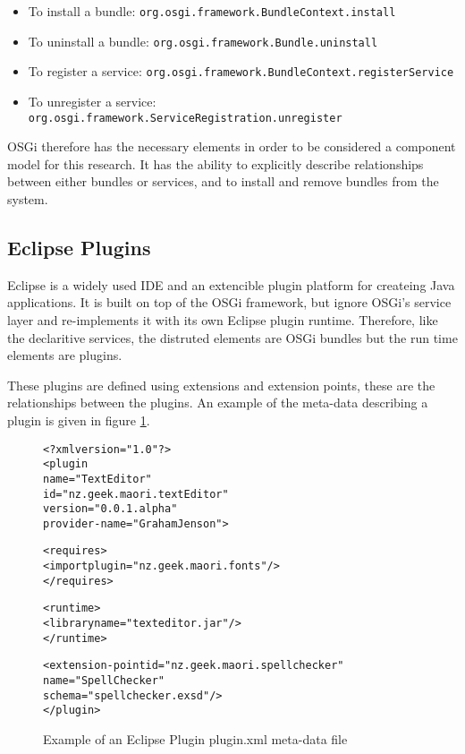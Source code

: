 \begin{itemize}
  \item To install a bundle: \verb+org.osgi.framework.BundleContext.install+
  \item To uninstall a bundle: \verb+org.osgi.framework.Bundle.uninstall+
  \item To register a service: \verb+org.osgi.framework.BundleContext.registerService+
  \item To unregister a service: \verb+org.osgi.framework.ServiceRegistration.unregister+
\end{itemize}

OSGi therefore has the necessary elements in order to be considered a component model for this research. 
It has the ability to explicitly describe relationships between either bundles or services, and to install and remove bundles from the system.

\subsection{Eclipse Plugins}
Eclipse is a widely used IDE and an extencible plugin platform for createing Java applications.
It is built on top of the OSGi framework, but ignore OSGi's service layer and re-implements it with its own Eclipse plugin runtime.
Therefore, like the declaritive services, the distruted elements are OSGi bundles but the run time elements are plugins.

These plugins are defined using extensions and extension points, these are the relationships between the plugins.
An example of the meta-data describing a plugin is given in figure \ref{eclipseplugin}. 

\begin{figure}[htp]
\begin{center}
\begin{alltt}
<?xml version="1.0"?>
<plugin
    name="Text Editor"
    id="nz.geek.maori.textEditor"
    version="0.0.1.alpha"
    provider-name="Graham Jenson">
    
    <requires>
        <import plugin="nz.geek.maori.fonts"/>
    </requires>

    <runtime>
        <library name="texteditor.jar"/>
    </runtime>
    
    <extension-point id="nz.geek.maori.spellchecker" 
        name="Spell Checker" 
        schema="spellchecker.exsd"/>
</plugin>
\end{alltt}
  \caption[Eclipse Plugin meta-data]{Example of an Eclipse Plugin plugin.xml meta-data file}
  \label{eclipseplugin}
\end{center}
\end{figure}

